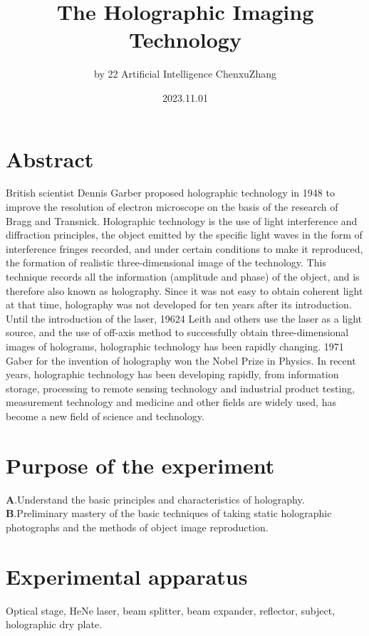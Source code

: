 \documentclass[UTF8]{article}
\title{The Holographic Imaging Technology}
\author{by 22 Artificial Intelligence ChenxuZhang}
\date{2023.11.01}
\begin{document}
	
	\fancyfoot[C]{\thepage}
	
	\maketitle
	\tableofcontents
	\newpage
	
	\section{Abstract}
British scientist Dennis Garber proposed holographic technology in 1948 to improve the resolution of electron microscope on the basis of the research of Bragg and Transnick. Holographic technology is the use of light interference and diffraction principles, the object emitted by the specific light waves in the form of interference fringes recorded, and under certain conditions to make it reproduced, the formation of realistic three-dimensional image of the technology. This technique records all the information (amplitude and phase) of the object, and is therefore also known as holography. Since it was not easy to obtain coherent light at that time, holography was not developed for ten years after its introduction. Until the introduction of the laser, 19624 Leith and others use the laser as a light source, and the use of off-axis method to successfully obtain three-dimensional images of holograms, holographic technology has been rapidly changing. 1971 Gaber for the invention of holography won the Nobel Prize in Physics. In recent years, holographic technology has been developing rapidly, from information storage, processing to remote sensing technology and industrial product testing, measurement technology and medicine and other fields are widely used, has become a new field of science and technology.
 
	
\section{Purpose of the experiment}
   $\bm{A}$.Understand the basic principles and characteristics of holography.\\
   $\bm{B}$.Preliminary mastery of the basic techniques of taking static holographic photographs and the methods of object image reproduction.

	\section{Experimental apparatus}
    Optical stage, HeNe laser, beam splitter, beam expander, reflector, subject, holographic dry plate.
    
\end{document}
